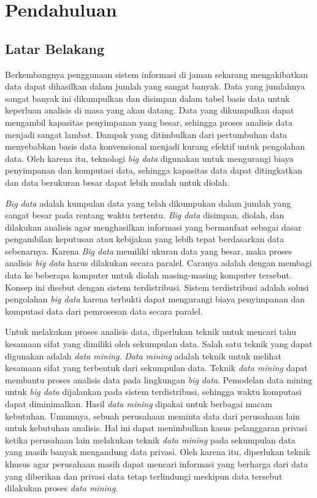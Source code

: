 \chapter{Pendahuluan}
\label{chap:intro}
   
\section{Latar Belakang}
\label{sec:label}
Berkembangnya penggunaan sistem informasi di jaman sekarang mengakibatkan data dapat dihasilkan dalam jumlah yang sangat banyak. Data yang jumlahnya sangat banyak ini dikumpulkan dan disimpan dalam tabel basis data untuk keperluan analisis di masa yang akan datang. Data yang dikumpulkan dapat mengambil kapasitas penyimpanan yang besar, sehingga proses analisis data menjadi sangat lambat. Dampak yang ditimbulkan dari pertumbuhan data menyebabkan basis data konvensional menjadi kurang efektif untuk pengolahan data. Oleh karena itu, teknologi \textit{big data} digunakan untuk mengurangi biaya penyimpanan dan komputasi data, sehingga kapasitas data dapat ditingkatkan dan data berukuran besar dapat lebih mudah untuk diolah.

{\it Big data} adalah kumpulan data yang telah dikumpukan dalam jumlah yang sangat besar pada rentang waktu tertentu. {\it Big data} disimpan, diolah, dan dilakukan analisis agar menghasilkan informasi yang bermanfaat sebagai dasar pengambilan keputusan atau kebijakan yang lebih tepat berdasarkan data sebenarnya. Karena {\it Big data} memiliki ukuran data yang besar, maka proses analisis \textit{big data} harus dilakukan secara paralel. Caranya adalah dengan membagi data ke beberapa komputer untuk diolah masing-masing komputer tersebut. Konsep ini disebut dengan sistem terdistribusi. Sistem terdistribusi adalah solusi pengolahan \textit{big data} karena terbukti dapat mengurangi biaya penyimpanan dan komputasi data dari pemrosesan data secara paralel. 

Untuk melakukan proses analisis data, diperlukan teknik untuk mencari tahu kesamaan sifat yang dimiliki oleh sekumpulan data. Salah satu teknik yang dapat digunakan adalah {\it data mining}. {\it Data mining} adalah teknik untuk melihat kesamaan sifat yang terbentuk dari sekumpulan data. Teknik {\it data mining} dapat membantu proses analisis data pada lingkungan \textit{big data}. Pemodelan data mining untuk \textit{big data} dijalankan pada sistem terdistribusi, sehingga waktu komputasi dapat diminimalkan. Hasil \textit{data mining} dipakai untuk berbagai macam kebutuhan. Umumnya, sebuah perusahaan meminta data dari perusahaan lain untuk kebutuhan analisis. Hal ini dapat menimbulkan kasus pelanggaran privasi ketika perusahaan lain melakukan teknik \textit{data mining} pada sekumpulan data yang masih banyak mengandung data privasi. Oleh karena itu, diperlukan teknik khusus agar perusahaan masih dapat mencari informasi yang berharga dari data yang diberikan dan  privasi data tetap terlindungi meskipun data tersebut dilakukan proses {\it data mining}.

